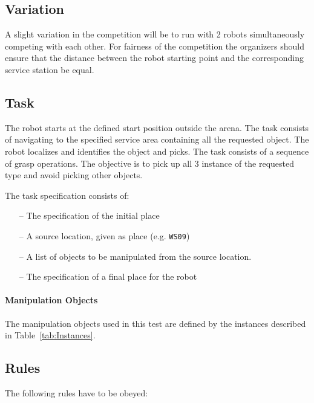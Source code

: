 \subsection{Variation}
A slight variation in the competition will be to run with 2 robots simultaneously competing with each other.
For fairness of the competition the organizers should ensure that the distance between the robot starting 
point and the corresponding service station be equal.
 
\subsection{Task}
The robot starts at the defined start position outside the arena.
The task consists of navigating to the specified service area containing all the 
requested object. The robot localizes and identifies the object and picks.
The task consists of a sequence of grasp operations. The objective is to pick up all 3 instance of the requested type and avoid picking other objects.
\par
The task specification consists of:
\begin{itemize}
	\item[--] The specification of the initial place
	\item[--] A source location, given as place (e.g. \texttt{WS09})
	\item[--] A list of objects to be manipulated from the source location.
	\item[--] The specification of a final place for the robot
\end{itemize}

\paragraph{Manipulation Objects}
The manipulation objects used in this test are defined by the instances described in Table~\ref{tab:Instances}.

\subsection{Rules}
The following rules have to be obeyed:

